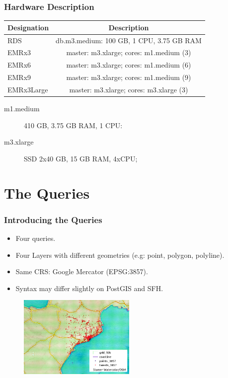 \documentclass[hyperref={pdfpagelabels=true}]{beamer}
\begin{document}
\begin{frame}
\frametitle{Hardware Description}
\begin{table}
\begin{tabular}{l | c }
Designation & Description \\
\hline \hline
RDS & db.m3.medium: 100 GB, 1 CPU, 3.75 GB RAM\\ 
EMRx3 & master: m3.xlarge; cores: m1.medium (3)\\
EMRx6 & master: m3.xlarge; cores: m1.medium (6)\\
EMRx9 & master: m3.xlarge; cores: m1.medium (9) \\
EMRx3Large & master: m3.xlarge; cores: m3.xlarge (3)\\
\end{tabular}
      \vspace{5mm}  
\begin{description}
\item[m1.medium] 410 GB, 3.75 GB RAM, 1 CPU:
\item[m3.xlarge] SSD 2x40 GB, 15 GB RAM, 4xCPU;  	
\end{description}

\end{table}
\end{frame}

\section{The Queries} 
\begin{frame}
\frametitle{Introducing the Queries}
   \begin{itemize}    
      \item<1->Four queries.
      \item<1->Four Layers with different geometries (e.g: point, polygon, polyline).
      \item<1->Same CRS: Google Mercator (EPSG:3857).
      \item<1->Syntax may differ slightly on PostGIS and SFH.      
    \end{itemize} 
    \begin{figure}       
	\includegraphics[width=0.5\textwidth]{layers_legend.png}      
     \end{figure}            
\end{frame}
\end{document}
